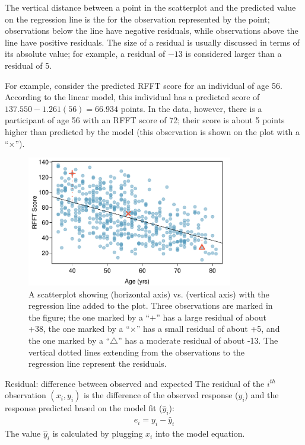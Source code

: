 The vertical distance between a point in the scatterplot and the predicted value on the regression line is the  for the observation represented by the point; observations below the line have negative residuals, while observations above the line have positive residuals. The size of a residual is usually discussed in terms of its absolute value; for example, a residual of $-13$ is considered larger than a residual of 5.

For example, consider the predicted RFFT score for an individual of age 56. According to the linear model, this individual has a predicted score of $137.550 - 1.261(56) = 66.934$ points. In the data, however, there is a participant of age 56 with an RFFT score of 72; their score is about 5 points higher than predicted by the model (this observation is shown on the plot with a ``$\times$'').

\begin{figure}[h]
	\centering
	\includegraphics[width=0.8\textwidth]
	{ch_09a_simple_linear_regression_oi_biostat/figures/prevendResid/prevendResid.pdf}
	\caption{A scatterplot showing  (horizontal axis) vs.  (vertical axis) with the regression line added to the plot. Three observations are marked in the figure; the one marked by a ``$+$'' has a large residual of about +38, the one marked by a ``$\times$'' has a small residual of about +5, and the one marked by a ``$\triangle$'' has a moderate residual of about -13. The vertical dotted lines extending from the observations to the regression line represent the residuals.}
	\label{prevendResid}
\end{figure}


\textD{\newpage}

\begin{onebox}{Residual: difference between observed and expected}
The residual of the $i^{th}$ observation $(x_i, y_i)$ is the difference of the observed response ($y_i$) and the response predicted based on the model fit ($\widehat{y}_i$):
\begin{eqnarray*}
e_i = y_i - \widehat{y}_i
\end{eqnarray*}
The value $\widehat{y}_i$ is calculated by plugging $x_i$ into the model equation.
\end{onebox}

